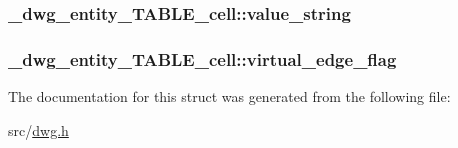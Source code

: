 \hypertarget{struct__dwg__entity__TABLE__cell_a82950597a4dbbe6fb41e0d517383a4cd}{
\subsubsection[{value\-\_\-string}]{ {\bf \-\_\-dwg\-\_\-entity\-\_\-\-T\-A\-B\-L\-E\-\_\-cell\-::value\-\_\-string}}}\label{struct__dwg__entity__TABLE__cell_a82950597a4dbbe6fb41e0d517383a4cd}
\hypertarget{struct__dwg__entity__TABLE__cell_ab1f0dca6006f9a5d97eb6332062f04d9}{
\subsubsection[{virtual\-\_\-edge\-\_\-flag}]{ {\bf \-\_\-dwg\-\_\-entity\-\_\-\-T\-A\-B\-L\-E\-\_\-cell\-::virtual\-\_\-edge\-\_\-flag}}}\label{struct__dwg__entity__TABLE__cell_ab1f0dca6006f9a5d97eb6332062f04d9}


\-The documentation for this struct was generated from the following file\-:\begin{DoxyCompactItemize}
\item 
src/\hyperlink{dwg_8h}{dwg.\-h}\end{DoxyCompactItemize}

